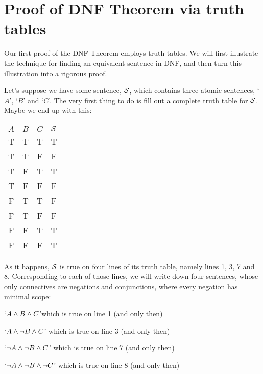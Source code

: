 \section{Proof of DNF Theorem via truth tables}
\label{s:DNFTruthTable}

Our first proof of the DNF Theorem employs truth tables. We will first illustrate the technique for finding an equivalent sentence in DNF, and then turn this illustration into a rigorous proof. 

Let's suppose we have some sentence, $\mathcal{S}$, which contains three atomic sentences, `$A$', `$B$' and `$C$'. The very first thing to do is fill out a complete truth table for $\mathcal{S}$. Maybe we end up with this:
\begin{center}
\begin{tabular}{c c c | c}
$A$ & $B$ & $C$ & $\mathcal{S}$\\
\hline
 T & T & T & T \\
 T & T & F & F \\
 T & F & T & T \\
 T & F & F & F \\
 F & T & T & F \\
 F & T & F & F \\
 F & F & T & T \\
 F & F & F & T
\end{tabular}
\end{center}
%
%
As it happens, $\mathcal{S}$ is true on four lines of its truth table, namely lines 1, 3, 7 and 8. Corresponding to each of those lines, we will write down four sentences, whose only connectives are negations and conjunctions, where every negation has minimal scope:
	\begin{earg}
		\item[\textbullet]  `$A \wedge B \wedge C$'\hfill which is true on line 1 (and only then)
		\item[\textbullet] `$A \wedge \neg B \wedge C$' \hfill which is true on line 3 (and only then)
		\item[\textbullet] `$\neg A \wedge \neg B \wedge C$' \hfill which is true on line 7 (and only then)
		\item[\textbullet] `$\neg A \wedge \neg B \wedge \neg C$' \hfill which is true on line 8 (and only then)
	\end{earg}
